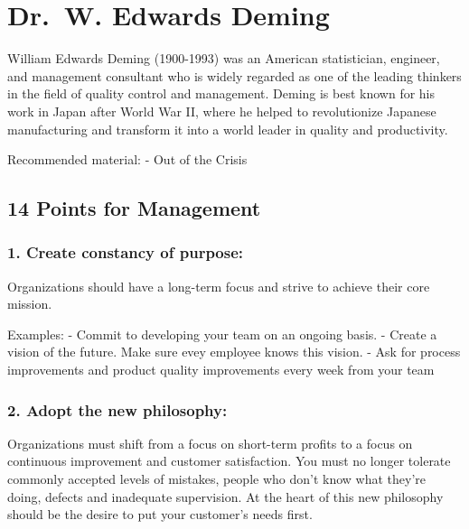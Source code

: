 \documentclass[11pt]{article}
\begin{document}
    

    \hypertarget{dr.-w.-edwards-deming}{%
\section{Dr.~W. Edwards Deming}\label{dr.-w.-edwards-deming}}

    William Edwards Deming (1900-1993) was an American statistician,
engineer, and management consultant who is widely regarded as one of the
leading thinkers in the field of quality control and management. Deming
is best known for his work in Japan after World War II, where he helped
to revolutionize Japanese manufacturing and transform it into a world
leader in quality and productivity.

Recommended material: - Out of the Crisis

\hypertarget{points-for-management}{%
\subsection{14 Points for Management}\label{points-for-management}}

\hypertarget{create-constancy-of-purpose}{%
\subsubsection{1. Create constancy of
purpose:}\label{create-constancy-of-purpose}}

Organizations should have a long-term focus and strive to achieve their
core mission.

Examples: - Commit to developing your team on an ongoing basis. - Create
a vision of the future. Make sure evey employee knows this vision. - Ask
for process improvements and product quality improvements every week
from your team

\hypertarget{adopt-the-new-philosophy}{%
\subsubsection{2. Adopt the new
philosophy:}\label{adopt-the-new-philosophy}}

Organizations must shift from a focus on short-term profits to a focus
on continuous improvement and customer satisfaction. You must no longer
tolerate commonly accepted levels of mistakes, people who don't know
what they're doing, defects and inadequate supervision. At the heart of
this new philosophy should be the desire to put your customer's needs
first.
\end{document}
